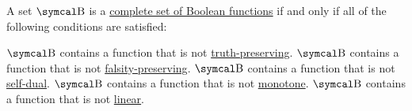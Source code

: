 \begin{theorem}\label{thm:posts_completeness_theorem}
  A set \( \CB \) is a \hyperref[def:boolean_closure]{complete set of Boolean functions} if and only if all of the following conditions are satisfied:
  \begin{PropEnum}
     \( \CB \) contains a function that is not \hyperref[def:boolean_functions_in_f2/truth_preserving]{truth-preserving}.
     \( \CB \) contains a function that is not \hyperref[def:boolean_functions_in_f2/falsity_preserving]{falsity-preserving}.
     \( \CB \) contains a function that is not \hyperref[def:boolean_functions_in_f2/self_dual]{self-dual}.
     \( \CB \) contains a function that is not \hyperref[def:boolean_functions_in_f2/monotone]{monotone}.
     \( \CB \) contains a function that is not \hyperref[def:boolean_functions_in_f2/linear]{linear}.
  \end{PropEnum}
\end{theorem}

